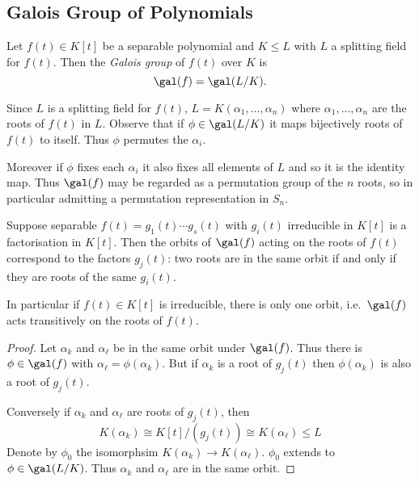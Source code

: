 \documentclass[a4paper]{article}
\begin{document}
\subsection{Galois Group of Polynomials}

\begin{definition}
  Let \(f(t) \in K[t]\) be a separable polynomial and \(K \leq L\) with \(L\) a splitting field for \(f(t)\). Then the \emph{Galois group} of \(f(t)\) over \(K\) is
  \[
    \gal(f) = \gal(L/K).
  \]
\end{definition}

Since \(L\) is a splitting field for \(f(t)\), \(L = K(\alpha_1, \dots, \alpha_n)\) where \(\alpha_1, \dots, \alpha_n\) are the roots of \(f(t)\) in \(L\). Observe that if \(\phi \in \gal(L/K)\) it maps bijectively roots of \(f(t)\) to itself. Thus \(\phi\) permutes the \(\alpha_i\).

Moreover if \(\phi\) fixes each \(\alpha_i\) it also fixes all elements of \(L\) and so it is the identity map. Thus \(\gal(f)\) may be regarded as a permutation group of the \(n\) roots, so in particular admitting a permutation representation in \(S_n\).

\begin{lemma}
  \label{lem:galois orbits}
  Suppose separable \(f(t) = g_1(t) \cdots g_s(t)\) with \(g_i(t)\) irreducible in \(K[t]\) is a factorisation in \(K[t]\). Then the orbits of \(\gal(f)\) acting on the roots of \(f(t)\) correspond to the factors \(g_j(t)\): two roots are in the same orbit if and only if they are roots of the same \(g_i(t)\).

  In particular if \(f(t) \in K[t]\) is irreducible, there is only one orbit, i.e.\ \(\gal(f)\) acts transitively on the roots of \(f(t)\).
\end{lemma}

\begin{proof}
  Let \(\alpha_k\) and \(\alpha_\ell\) be in the same orbit under \(\gal(f)\). Thus there is \(\phi \in \gal(f)\) with \(\alpha_\ell = \phi(\alpha_k)\). But if \(\alpha_k\) is a root of \(g_j(t)\) then \(\phi(\alpha_k)\) is also a root of \(g_j(t)\).

  Conversely if \(\alpha_k\) and \(\alpha_\ell\) are roots of \(g_j(t)\), then
  \[
    K(\alpha_k) \cong K[t]/(g_j(t)) \cong K(\alpha_\ell) \leq L
  \]
  Denote by \(\phi_0\) the isomorphsim \(K(\alpha_k) \to K(\alpha_\ell)\). \(\phi_0\) extends to \(\phi \in \gal(L/K)\). Thus \(\alpha_k\) and \(\alpha_\ell\) are in the same orbit.
\end{proof}
\end{document}
